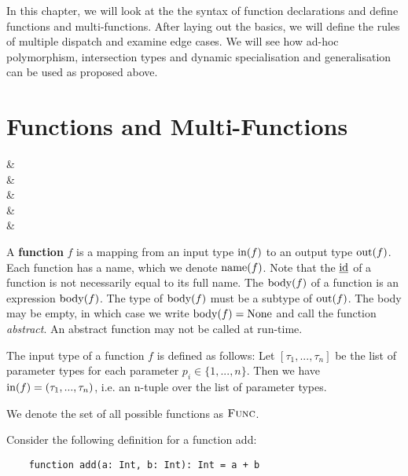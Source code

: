 \noindent In this chapter, we will look at the the syntax of function declarations and define functions and multi-functions. After laying out the basics, we will define the rules of multiple dispatch and examine edge cases. We will see how ad-hoc polymorphism, intersection types and dynamic specialisation and generalisation can be used as proposed above. 



\section{Functions and Multi-Functions}

\begin{grammar}
 &\produce {} \\
 &\produce {} \\
 &\produce {} \\
&\alt {} \\
 &\produce {}
\end{grammar}

\begin{definition}
	A \textbf{function} $f$ is a mapping from an input type $\operatorname{in}(f)$ to an output type $\operatorname{out}(f)$. Each function has a name, which we denote $\operatorname{name}(f)$. Note that the $\text{\underline{id}}$ of a function is not necessarily equal to its full name. The $\operatorname{body}(f)$ of a function is an expression $\operatorname{body}(f)$. The type of $\operatorname{body}(f)$ must be a subtype of $\operatorname{out}(f)$. The body may be empty, in which case we write $\operatorname{body}(f) = \text{None}$ and call the function \textit{abstract}. An abstract function may not be called at run-time.

	The input type of a function $f$ is defined as follows: Let $[\tau_1, ..., \tau_n]$ be the list of parameter types for each parameter $p_i \in \{ 1, ..., n \}$. Then we have $\operatorname{in}(f) = (\tau_1, ..., \tau_n)$, i.e. an n-tuple over the list of parameter types.

	We denote the set of all possible functions as $\textsc{Func}$.
\end{definition}

\noindent Consider the following definition for a function add:
\begin{lstlisting}
    function add(a: Int, b: Int): Int = a + b
\end{lstlisting}
	

